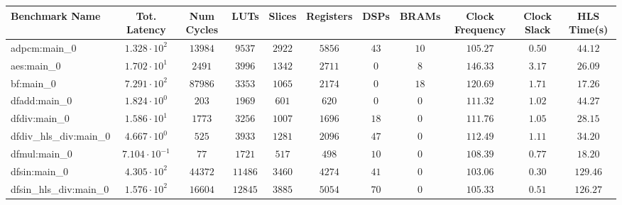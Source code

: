 \begin{tabular}{|l|c|c|c|c|c|c|c|c|c|c|}
\hline
Benchmark Name          & Tot. Latency            & Num Cycles & LUTs      & Slices    & Registers & DSPs    & BRAMs   & Clock Frequency & Clock Slack & HLS Time(s) \\
\hline
adpcm:main\_0           & $ 1.328 \cdot 10^{2}  $ & $ 13984  $ & $ 9537  $ & $ 2922  $ & $ 5856  $ & $ 43  $ & $ 10  $ & $ 105.27      $ & $ 0.50    $ & $ 44.12   $ \\
aes:main\_0             & $ 1.702 \cdot 10^{1}  $ & $ 2491   $ & $ 3996  $ & $ 1342  $ & $ 2711  $ & $ 0   $ & $ 8   $ & $ 146.33      $ & $ 3.17    $ & $ 26.09   $ \\
bf:main\_0              & $ 7.291 \cdot 10^{2}  $ & $ 87986  $ & $ 3353  $ & $ 1065  $ & $ 2174  $ & $ 0   $ & $ 18  $ & $ 120.69      $ & $ 1.71    $ & $ 17.26   $ \\
dfadd:main\_0           & $ 1.824 \cdot 10^{0}  $ & $ 203    $ & $ 1969  $ & $ 601   $ & $ 620   $ & $ 0   $ & $ 0   $ & $ 111.32      $ & $ 1.02    $ & $ 44.27   $ \\
dfdiv:main\_0           & $ 1.586 \cdot 10^{1}  $ & $ 1773   $ & $ 3256  $ & $ 1007  $ & $ 1696  $ & $ 18  $ & $ 0   $ & $ 111.76      $ & $ 1.05    $ & $ 28.15   $ \\
dfdiv\_hls\_div:main\_0 & $ 4.667 \cdot 10^{0}  $ & $ 525    $ & $ 3933  $ & $ 1281  $ & $ 2096  $ & $ 47  $ & $ 0   $ & $ 112.49      $ & $ 1.11    $ & $ 34.20   $ \\
dfmul:main\_0           & $ 7.104 \cdot 10^{-1} $ & $ 77     $ & $ 1721  $ & $ 517   $ & $ 498   $ & $ 10  $ & $ 0   $ & $ 108.39      $ & $ 0.77    $ & $ 18.20   $ \\
dfsin:main\_0           & $ 4.305 \cdot 10^{2}  $ & $ 44372  $ & $ 11486 $ & $ 3460  $ & $ 4274  $ & $ 41  $ & $ 0   $ & $ 103.06      $ & $ 0.30    $ & $ 129.46  $ \\
dfsin\_hls\_div:main\_0 & $ 1.576 \cdot 10^{2}  $ & $ 16604  $ & $ 12845 $ & $ 3885  $ & $ 5054  $ & $ 70  $ & $ 0   $ & $ 105.33      $ & $ 0.51    $ & $ 126.27  $ \\

\end{tabular}
